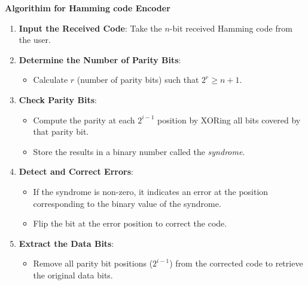\documentclass{article}
\numberwithin{equation}{section}
\numberwithin{figure}{section}
\numberwithin{table}{section}
\begin{document}
\textbf{Algorithim for Hamming code Encoder} 
\begin{enumerate}
    \item \textbf{Input the Received Code}: Take the $n$-bit received Hamming code from the user.
    \item \textbf{Determine the Number of Parity Bits}:
          \begin{itemize}
              \item Calculate $r$ (number of parity bits) such that $2^r \geq n + 1$.
          \end{itemize}
    \item \textbf{Check Parity Bits}:
          \begin{itemize}
              \item Compute the parity at each $2^{i-1}$ position by XORing all bits covered by that parity bit.
              \item Store the results in a binary number called the \textit{syndrome}.
          \end{itemize}
    \item \textbf{Detect and Correct Errors}:
          \begin{itemize}
              \item If the syndrome is non-zero, it indicates an error at the position corresponding to the binary value of the syndrome.
              \item Flip the bit at the error position to correct the code.
          \end{itemize}
    \item \textbf{Extract the Data Bits}:
          \begin{itemize}
              \item Remove all parity bit positions ($2^{i-1}$) from the corrected code to retrieve the original data bits.
          \end{itemize}
\end{enumerate}
\end{document}
